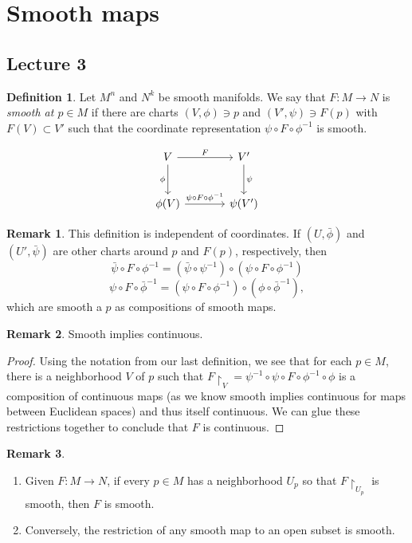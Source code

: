 \documentclass[10pt,letterpaper,cm]{nupset}
\theoremstyle{definition}
\newtheorem*{definition}{Definition}
\newtheorem{remark}{Remark}
\newcommand{\1}{\mathbf{1}}
\newcommand{\0}{\vec 0}
\begin{document}
\section{Smooth maps}

\subsection{Lecture 3}

\begin{definition}
Let $M^n$ and $N^k$ be smooth manifolds. We say that $F: M \to N$ is \textit{smooth at $p \in M$} if there are charts $(V, \phi) \ni p$ and $(V', \psi) \ni F(p)$ with $F(V) \subset V'$ such that the coordinate representation $\psi \circ F \circ \phi^{-1}$ is smooth.
\end{definition}
\[
\begin{tikzcd}[row sep=large, column sep = large]
V \arrow[r, "F"] \arrow[d, "\phi", swap]
& V' \arrow[d, "\psi"] \\
\phi(V) \arrow[r, "\psi \circ F \circ \phi^{-1}"]
& \psi(V')
\end{tikzcd}
\]

\begin{remark}
This definition is independent of coordinates. If $(U, \bar{\phi})$ and $(U', \bar{\psi})$ are other charts around $p$ and $F(p)$, respectively, then $$\bar{\psi} \circ F \circ \phi^{-1} = (\bar{\psi} \circ \psi^{-1}) \circ (\psi \circ F \circ \phi^{-1})$$ $$\psi \circ F\circ \bar{\phi}^{-1} = (\psi \circ F \circ \phi^{-1}) \circ (\phi \circ \bar{\phi}^{-1}),$$ which are smooth a $p$ as compositions of smooth maps.
\end{remark}

\begin{remark}
Smooth implies continuous.
\end{remark}
\begin{proof}
Using the notation from our last definition, we see that for each $p\in M$, there is a neighborhood $V$ of $p$ such that $F\restriction_V =  \psi^{-1} \circ \psi \circ F \circ \phi^{-1} \circ \phi$ is a composition of continuous maps (as we know smooth implies continuous for maps between Euclidean spaces) and thus itself continuous. We can glue these restrictions together to conclude that $F$ is continuous. 
\end{proof}


\begin{remark} $ $
\begin{enumerate}
\item Given $F:M\to N$, if every $p\in M$ has a neighborhood $U_p$ so that $F\restriction_{U_p}$ is smooth, then $F$ is smooth.
\item Conversely, the restriction of any smooth map to an open subset is smooth. 
\end{enumerate}
\end{remark}
\end{document}
